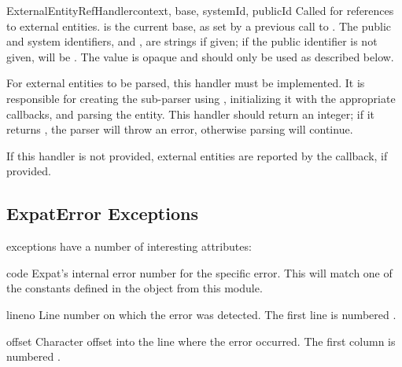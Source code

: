 \begin{methoddesc}[xmlparser]{ExternalEntityRefHandler}{context, base,
                                                        systemId, publicId}
Called for references to external entities.   is the current
base, as set by a previous call to .  The public and
system identifiers,  and , are strings if
given; if the public identifier is not given,  will be
.  The  value is opaque and should only be
used as described below.

For external entities to be parsed, this handler must be implemented.
It is responsible for creating the sub-parser using
, initializing it with
the appropriate callbacks, and parsing the entity.  This handler
should return an integer; if it returns , the parser will
throw an  error,
otherwise parsing will continue.

If this handler is not provided, external entities are reported by the
 callback, if provided.
\end{methoddesc}


\subsection{ExpatError Exceptions \label{expaterror-objects}}

 exceptions have a number of interesting
attributes:

\begin{memberdesc}[ExpatError]{code}
  Expat's internal error number for the specific error.  This will
  match one of the constants defined in the  object from
  this module.
\end{memberdesc}

\begin{memberdesc}[ExpatError]{lineno}
  Line number on which the error was detected.  The first line is
  numbered .
\end{memberdesc}

\begin{memberdesc}[ExpatError]{offset}
  Character offset into the line where the error occurred.  The first
  column is numbered .
\end{memberdesc}


